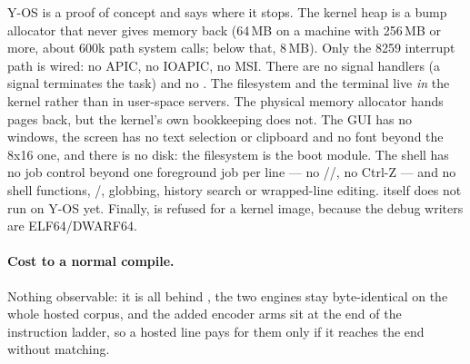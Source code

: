 Y-OS is a proof of concept and says where it stops. The kernel heap is a bump
allocator that never gives memory back (64\,MB on a machine with 256\,MB or
more, about 600k path system calls; below that, 8\,MB). Only the 8259
interrupt path is wired: no APIC, no IOAPIC, no MSI. There are no signal
handlers (a signal terminates the task) and no . The filesystem and
the terminal live \emph{in} the kernel rather than in user-space servers. The
physical memory allocator hands pages back, but the kernel's own bookkeeping
does not. The GUI has no windows, the screen has no text selection or clipboard
and no font beyond the 8x16 one, and there is no disk: the filesystem is the
boot module. The shell has no job control beyond one foreground job per line
--- no //, no Ctrl-Z --- and no shell functions,
/, globbing, history search or wrapped-line editing.
 itself does not run on Y-OS yet.
Finally,  is refused for a kernel image, because the debug writers are
ELF64/DWARF64.

\paragraph{Cost to a normal compile.} Nothing observable: it is all
behind , the two engines stay byte-identical on the
whole hosted corpus, and the added encoder arms sit at the end of the
instruction ladder, so a hosted line pays for them only if it reaches the end
without matching.
